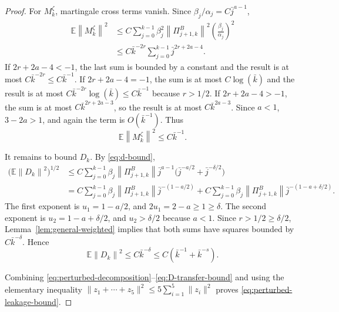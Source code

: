 \documentclass{article}
\newcommand{\E}{\mathbb{E}}
\newcommand{\norm}[1]{\left\lVert #1\right\rVert}
\begin{document}
\begin{proof}
For $M^\zeta_k$, martingale cross terms vanish. Since $\beta_j/\alpha_j=C\bar j^{a-1}$,
\begin{align*}
  \E\norm{M^\zeta_k}^2
  &\le C\sum_{j=0}^{k-1}\beta_j^2\norm{\Pi^B_{j+1,k}}^2\left(\frac{\beta_j}{\alpha_j}\right)^2 \\
  &\le C\bar k^{-2r}\sum_{j=0}^{k-1}\bar j^{2r+2a-4}.
\end{align*}
If $2r+2a-4<-1$, the last sum is bounded by a constant and the result is at most $C\bar k^{-2r}\le C\bar k^{-1}$. If $2r+2a-4=-1$, the sum is at most $C\log(\bar k)$ and the result is at most $C\bar k^{-2r}\log(\bar k)\le C\bar k^{-1}$ because $r>1/2$. If $2r+2a-4>-1$, the sum is at most $C\bar k^{2r+2a-3}$, so the result is at most $C\bar k^{2a-3}$. Since $a<1$, $3-2a>1$, and again the term is $O(\bar k^{-1})$. Thus
\begin{equation}
  \E\norm{M^\zeta_k}^2\le C\bar k^{-1}. \label{eq:Mzeta-transfer-bound}
\end{equation}

It remains to bound $D_k$. By \eqref{eq:d-bound},
\begin{align*}
  \big(\E\norm{D_k}^2\big)^{1/2}
  &\le C\sum_{j=0}^{k-1}\beta_j\norm{\Pi^B_{j+1,k}}\bar j^{a-1}
      \big(\bar j^{-a/2}+\bar j^{-\delta/2}\big) \\
  &= C\sum_{j=0}^{k-1}\beta_j\norm{\Pi^B_{j+1,k}}\bar j^{-(1-a/2)}
    +C\sum_{j=0}^{k-1}\beta_j\norm{\Pi^B_{j+1,k}}\bar j^{-(1-a+\delta/2)}.
\end{align*}
The first exponent is $u_1=1-a/2$, and $2u_1=2-a\ge1\ge\delta$. The second exponent is $u_2=1-a+\delta/2$, and $u_2>\delta/2$ because $a<1$. Since $r>1/2\ge\delta/2$, Lemma~\ref{lem:general-weighted} implies that both sums have squares bounded by $C\bar k^{-\delta}$. Hence
\begin{equation}
  \E\norm{D_k}^2\le C\bar k^{-\delta}
  \le C\left(\bar k^{-1}+\bar k^{-s}\right). \label{eq:D-transfer-bound}
\end{equation}

Combining \eqref{eq:perturbed-decomposition}--\eqref{eq:D-transfer-bound} and using the elementary inequality $\|z_1+\cdots+z_5\|^2\le5\sum_{i=1}^5\|z_i\|^2$ proves \eqref{eq:perturbed-leakage-bound}.
\end{proof}
\end{document}
